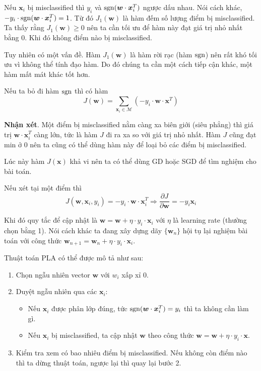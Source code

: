 Nếu $\bm{x}_i$ bị misclassified thì $y_i$ và $\operatorname{sgn} (\bm{w} \cdot \bm{x}_i^T)$ ngược dấu nhau. Nói cách khác, $-y_i \cdot \operatorname{sgn} (\bm{w} \cdot \bm{x}_i^T) = 1$. Từ đó $J_1(\bm{w})$ là hàm đếm số lượng điểm bị misclassified. Ta thấy rằng $J_1(\bm{w}) \geq 0$ nên ta cần tối ưu để hàm này đạt giá trị nhỏ nhất bằng 0. Khi đó không điểm nào bị misclassified.

Tuy nhiên có một vấn đề. Hàm $J_1(\bm{w})$ là hàm rời rạc (hàm $\operatorname{sgn}$) nên rất khó tối ưu vì không thể tính đạo hàm. Do đó chúng ta cần một cách tiếp cận khác, một hàm mất mát khác tốt hơn.

Nếu ta bỏ đi hàm $\operatorname{sgn}$ thì có hàm \[ J(\bm{w}) = \sum_{\bm{x}_i \in \mathcal{M}} (-y_i \cdot \bm{w} \cdot \bm{x}^T) \]

\textbf{Nhận xét}. Một điểm bị misclassified nằm càng xa biên giới (siêu phẳng) thì giá trị $\bm{w} \cdot \bm{x}_i^T$ càng lớn, tức là hàm $J$ đi ra xa so với giá trị nhỏ nhất. Hàm $J$ cũng đạt min ở 0 nên ta cũng có thể dùng hàm này để loại bỏ các điểm bị misclassified.

Lúc này hàm $J(\bm{x})$ khả vi nên ta có thể dùng GD hoặc SGD để tìm nghiệm cho bài toán.

Nếu xét tại một điểm thì \[ J(\bm{w}, \bm{x}_i, y_i) = -y_i \cdot \bm{w} \cdot \bm{x}_i^T \Rightarrow \dfrac{\partial J}{\partial \bm{w}} = -y_i \bm{x}_i \]

Khi đó quy tắc để cập nhật là $\bm{w} = \bm{w} + \eta \cdot y_i \cdot \bm{x}_i$ với $\eta$ là learning rate (thường chọn bằng 1). Nói cách khác ta đang xây dựng dãy $\{ \bm{w}_n \}$ hội tụ lại nghiệm bài toán với công thức $\bm{w}_{n+1} = \bm{w}_n + \eta \cdot y_i \cdot \bm{x}_i$.

Thuật toán PLA có thể được mô tả như sau:

\begin{enumerate}
    \item Chọn ngẫu nhiên vector $\bm{w}$ với $w_i$ xấp xỉ 0.
    \item Duyệt ngẫu nhiên qua các $\bm{x}_i$:
    \begin{itemize}
        \item Nếu $\bm{x}_i$ được phân lớp đúng, tức $\operatorname{sgn}(\bm{w} \cdot \bm{x}_i^T) = y_i$ thì ta không cần làm gì.
        \item Nếu $\bm{x}_i$ bị misclassified, ta cập nhật $\bm{w}$ theo công thức $\bm{w} = \bm{w} + \eta \cdot y_i \cdot \bm{x}$.
    \end{itemize}
    \item Kiểm tra xem có bao nhiêu điểm bị misclassified. Nếu không còn điểm nào thì ta dừng thuật toán, ngược lại thì quay lại bước 2.
\end{enumerate}